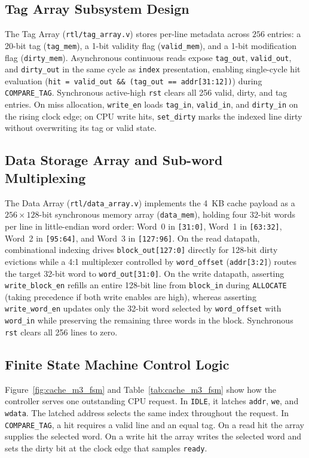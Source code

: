 \documentclass[conference]{IEEEtran}
\begin{document}
\subsection{Tag Array Subsystem Design}
The Tag Array (\texttt{rtl/tag\_array.v}) stores per-line metadata across $256$ entries: a 20-bit tag (\texttt{tag\_mem}), a 1-bit validity flag (\texttt{valid\_mem}), and a 1-bit modification flag (\texttt{dirty\_mem}). Asynchronous continuous reads expose \texttt{tag\_out}, \texttt{valid\_out}, and \texttt{dirty\_out} in the same cycle as \texttt{index} presentation, enabling single-cycle hit evaluation (\texttt{hit = valid\_out \&\& (tag\_out == addr[31:12])}) during \texttt{COMPARE\_TAG}. Synchronous active-high \texttt{rst} clears all 256 valid, dirty, and tag entries. On miss allocation, \texttt{write\_en} loads \texttt{tag\_in}, \texttt{valid\_in}, and \texttt{dirty\_in} on the rising clock edge; on CPU write hits, \texttt{set\_dirty} marks the indexed line dirty without overwriting its tag or valid state.

\subsection{Data Storage Array and Sub-word Multiplexing}
The Data Array (\texttt{rtl/data\_array.v}) implements the 4~KB cache payload as a $256 \times 128$-bit synchronous memory array (\texttt{data\_mem}), holding four 32-bit words per line in little-endian word order: Word~0 in \texttt{[31:0]}, Word~1 in \texttt{[63:32]}, Word~2 in \texttt{[95:64]}, and Word~3 in \texttt{[127:96]}. On the read datapath, combinational indexing drives \texttt{block\_out[127:0]} directly for 128-bit dirty evictions while a 4:1 multiplexer controlled by \texttt{word\_offset} (\texttt{addr[3:2]}) routes the target 32-bit word to \texttt{word\_out[31:0]}. On the write datapath, asserting \texttt{write\_block\_en} refills an entire 128-bit line from \texttt{block\_in} during \texttt{ALLOCATE} (taking precedence if both write enables are high), whereas asserting \texttt{write\_word\_en} updates only the 32-bit word selected by \texttt{word\_offset} with \texttt{word\_in} while preserving the remaining three words in the block. Synchronous \texttt{rst} clears all 256 lines to zero.

\subsection{Finite State Machine Control Logic}
Figure~\ref{fig:cache_m3_fsm} and Table~\ref{tab:cache_m3_fsm} show how the controller serves one outstanding CPU request. In \texttt{IDLE}, it latches \texttt{addr}, \texttt{we}, and \texttt{wdata}. The latched address selects the same index throughout the request. In \texttt{COMPARE\_TAG}, a hit requires a valid line and an equal tag. On a read hit the array supplies the selected word. On a write hit the array writes the selected word and sets the dirty bit at the clock edge that samples \texttt{ready}.
\end{document}
